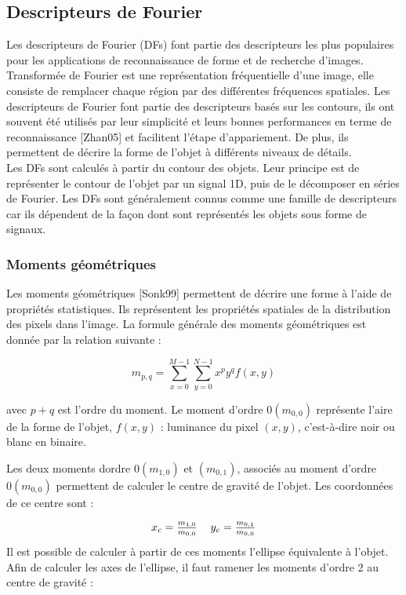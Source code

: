 \subsection{Descripteurs de Fourier}
Les descripteurs de Fourier (DFs) font partie des descripteurs les plus populaires pour les applications de reconnaissance de forme et de recherche d'images. Transformée de Fourier est une représentation fréquentielle d’une image, elle consiste de remplacer chaque région par des différentes fréquences spatiales. Les descripteurs de Fourier font partie des descripteurs
basés sur les contours, ils ont souvent été utilisés par leur simplicité et leurs bonnes performances en terme de reconnaissance [Zhan05] et facilitent l'étape d’appariement. De plus, ils permettent de décrire la forme de l’objet à différents niveaux de détails.\\

Les DFs sont calculés à partir du contour des objets. Leur principe est de représenter le contour de l'objet par un signal 1D, puis de le décomposer en séries de Fourier. Les DFs sont généralement connus comme une famille de descripteurs car ils dépendent de la façon dont sont représentés les objets sous forme de signaux.

\subsubsection{Moments géométriques}
Les moments géométriques [Sonk99] permettent de décrire une forme à l’aide de propriétés
statistiques. Ils représentent les propriétés spatiales de la distribution des pixels dans l’image.
La formule générale des moments géométriques est donnée par la relation suivante :

\begin{equation}
	m_{p,q} = \sum_{x=0}^{M-1}\sum_{y=0}^{N-1} x^p y^q f(x, y)
\end{equation}

avec $p+q$ est l'ordre du moment. Le moment d’ordre $0 (m_{0,0})$  représente l’aire de la forme de l'objet, $f(x, y)$ : luminance du pixel $(x, y)$, c’est-à-dire noir ou blanc en binaire.

Les deux moments dordre $0 (m_{1,0})$ et $(m_{0,1})$, associés au moment d’ordre $0 (m_{0,0})$
permettent de calculer le centre de gravité de l'objet. Les coordonnées de ce
centre sont :

\begin{equation}
		\begin{tabular}{cc}
		$x_{c} = \frac{m_{1,0}}{m_{0,0}}$ & $y_{c} = \frac{m_{0,1}}{m_{0,0}}$
		\end{tabular}
\end{equation}
Il est possible de calculer à partir de ces moments l’ellipse équivalente à
l’objet. Afin de calculer les axes de l’ellipse, il faut ramener les moments
d’ordre 2 au centre de gravité :

